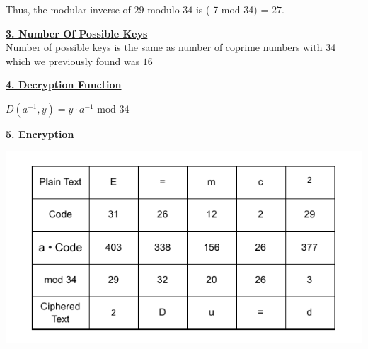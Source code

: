 Thus, the modular inverse of \(29\) modulo \(34\) is (-7 mod 34) = \(\boxed{27}\).

\vspace{1cm}
\textbf{\underline{3. Number Of Possible Keys}}\\[0.15cm]
Number of possible keys is the same as number of coprime numbers with 34 which we previously found was \(\boxed{16}\) 

\vspace{1cm}
\textbf{\underline{4. Decryption Function}}\\[0.15cm]
 \begin{center}
     \(\boxed{D(a^{-1},y) = y\cdot a^{-1} \text{ mod } 34}\)
 \end{center}

\newpage
\textbf{\underline{5. Encryption}}\\[0.15cm]

\begin{center}
    \includegraphics[height=0.3\textheight]{Exercices/EX1/encry.tab.drawio.pdf}
\end{center}


